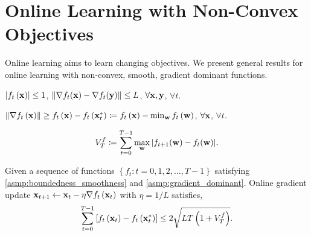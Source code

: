 \section{Online Learning with Non-Convex Objectives}

Online learning aims to learn changing objectives. We present general results for online learning with non-convex, smooth, gradient dominant functions.

\begin{asmp}
\label{asmp:boundedness_smoothness}
$\left| f_t\left({\mathbf{x}}\right) \right| \le 1$, $\left\| \nabla f_t({\mathbf{x}} ) - \nabla f_t({\mathbf{y}}) \right\| \le L $, $\forall {\mathbf{x}}, {\mathbf{y}}$, $\forall t$.
\end{asmp}

\begin{asmp}
\label{asmp:gradient_dominant}
$\left\| \nabla f_t\left({\mathbf{x}}\right) \right\| \ge f_t\left({\mathbf{x}}\right) - f_t\left({\mathbf{x}}_t^*\right) \coloneqq f_t\left({\mathbf{x}}\right) - \min_{{\mathbf{w}}}{ f_t\left({\mathbf{w}} \right)}$, $\forall {\mathbf{x}}$, $\forall t$.
\end{asmp}

\begin{defi}
\label{defi:function_variation}
\begin{equation*}
\begin{split}
    V_{T}^{f} \coloneqq \sum\limits_{t=0}^{T-1}{\max\limits_{{\mathbf{w}}}{\left| f_{t+1}({\mathbf{w}}) - f_{t}({\mathbf{w}}) \right| } }.
\end{split}
\end{equation*}
\end{defi}

\begin{thm}
\label{thm:online_learning_regret}
Given a sequence of functions $\left\{ f_t : t = 0, 1, 2, \dots, T-1 \right\}$ satisfying \cref{asmp:boundedness_smoothness} and \cref{asmp:gradient_dominant}. Online gradient update ${\mathbf{x}}_{t+1} \gets {\mathbf{x}}_{t} - \eta \nabla f_{t}\left({\mathbf{x}}_{t}\right)$ with $\eta = 1/L$ satisfies,
\begin{equation*}
\begin{split}
    \sum\limits_{t=0}^{T-1}{\left[ f_t\left({\mathbf{x}}_t\right) - f_t\left( {\mathbf{x}}_t^* \right) \right]} \le 2 \sqrt{L T \left( 1 + V_T^f \right)}.
\end{split}
\end{equation*}
\end{thm}

